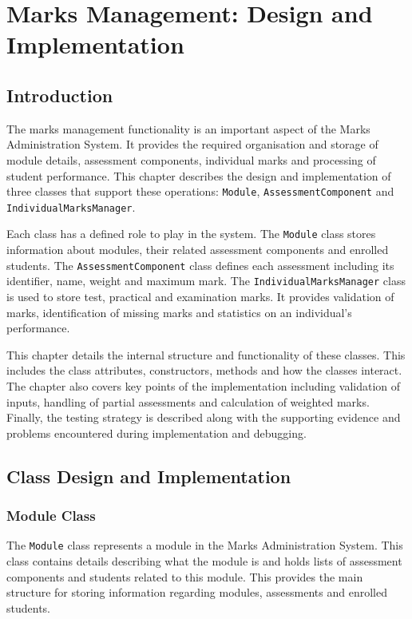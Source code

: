 \chapter{Marks Management: Design and Implementation}
\label{chap:marks-management}

\section{Introduction}

The marks management functionality is an important aspect of the Marks Administration System. It provides the required organisation and storage of module details, assessment components, individual marks and processing of student performance. This chapter describes the design and implementation of three classes that support these operations: \texttt{Module}, \texttt{AssessmentComponent} and \texttt{IndividualMarksManager}.

Each class has a defined role to play in the system. The \texttt{Module} class stores information about modules, their related assessment components and enrolled students. The \texttt{AssessmentComponent} class defines each assessment including its identifier, name, weight and maximum mark. The \texttt{IndividualMarksManager} class is used to store test, practical and examination marks. It provides validation of marks, identification of missing marks and statistics on an individual's performance.

This chapter details the internal structure and functionality of these classes. This includes the class attributes, constructors, methods and how the classes interact. The chapter also covers key points of the implementation including validation of inputs, handling of partial assessments and calculation of weighted marks. Finally, the testing strategy is described along with the supporting evidence and problems encountered during implementation and debugging.

\section{Class Design and Implementation}

\subsection{Module Class}

The \texttt{Module} class represents a module in the Marks Administration System. This class contains details describing what the module is and holds lists of assessment components and students related to this module. This provides the main structure for storing information regarding modules, assessments and enrolled students.

